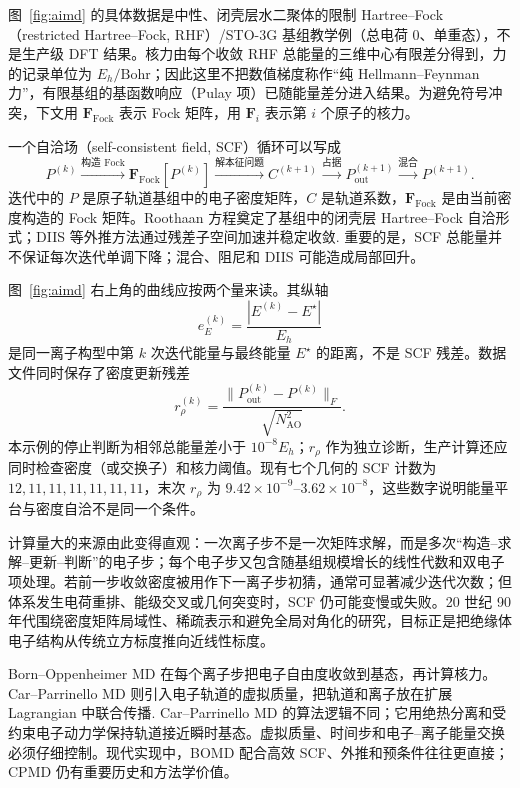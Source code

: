 \documentclass[UTF8,10pt,a4paper,fontset=none]{ctexart}
\begin{document}
图~\ref{fig:aimd} 的具体数据是中性、闭壳层水二聚体的限制 Hartree--Fock（restricted Hartree--Fock, RHF）/STO-3G 基组教学例（总电荷 0、单重态），不是生产级 DFT 结果。核力由每个收敛 RHF 总能量的三维中心有限差分得到，力的记录单位为 $E_h/\mathrm{Bohr}$；因此这里不把数值梯度称作“纯 Hellmann--Feynman 力”，有限基组的基函数响应（Pulay 项）已随能量差分进入结果。为避免符号冲突，下文用 $\mathbf F_{\mathrm{Fock}}$ 表示 Fock 矩阵，用 $\bm F_i$ 表示第 $i$ 个原子的核力。

一个自洽场（self-consistent field, SCF）循环可以写成
\begin{equation}
  P^{(k)} \xrightarrow{\text{构造 Fock}}
  \mathbf F_{\mathrm{Fock}}[P^{(k)}] \xrightarrow{\text{解本征问题}}
  C^{(k+1)} \xrightarrow{\text{占据}}
  P_{\mathrm{out}}^{(k+1)}
  \xrightarrow{\text{混合}} P^{(k+1)}.
\end{equation}
迭代中的 $P$ 是原子轨道基组中的电子密度矩阵，$C$ 是轨道系数，$\mathbf F_{\mathrm{Fock}}$ 是由当前密度构造的 Fock 矩阵。Roothaan 方程奠定了基组中的闭壳层 Hartree--Fock 自洽形式\cite{roothaan1951}；DIIS 等外推方法通过残差子空间加速并稳定收敛\cite{pulay1980}. 重要的是，SCF 总能量并不保证每次迭代单调下降；混合、阻尼和 DIIS 可能造成局部回升。

图~\ref{fig:aimd} 右上角的曲线应按两个量来读。其纵轴
\begin{equation}
  e_E^{(k)}=\frac{|E^{(k)}-E^\star|}{E_h}
\end{equation}
是同一离子构型中第 $k$ 次迭代能量与最终能量 $E^\star$ 的距离，不是 SCF 残差。数据文件同时保存了密度更新残差
\begin{equation}
  r_\rho^{(k)}=\frac{\lVert P_{\mathrm{out}}^{(k)}-P^{(k)}\rVert_F}{\sqrt{N_{\mathrm{AO}}^2}}.
\end{equation}
本示例的停止判断为相邻总能量差小于 $10^{-8}E_h$；$r_\rho$ 作为独立诊断，生产计算还应同时检查密度（或交换子）和核力阈值。现有七个几何的 SCF 计数为 $12,11,11,11,11,11,11$，末次 $r_\rho$ 为 $9.42\times10^{-9}$--$3.62\times10^{-8}$，这些数字说明能量平台与密度自洽不是同一个条件。

计算量大的来源由此变得直观：一次离子步不是一次矩阵求解，而是多次“构造--求解--更新--判断”的电子步；每个电子步又包含随基组规模增长的线性代数和双电子项处理。若前一步收敛密度被用作下一离子步初猜，通常可显著减少迭代次数；但体系发生电荷重排、能级交叉或几何突变时，SCF 仍可能变慢或失败。20 世纪 90 年代围绕密度矩阵局域性、稀疏表示和避免全局对角化的研究，目标正是把绝缘体电子结构从传统立方标度推向近线性标度\cite{goedecker1999}。

Born--Oppenheimer MD 在每个离子步把电子自由度收敛到基态，再计算核力。Car--Parrinello MD 则引入电子轨道的虚拟质量，把轨道和离子放在扩展 Lagrangian 中联合传播\cite{carparrinello1985}. Car--Parrinello MD 的算法逻辑不同；它用绝热分离和受约束电子动力学保持轨道接近瞬时基态。虚拟质量、时间步和电子--离子能量交换必须仔细控制。现代实现中，BOMD 配合高效 SCF、外推和预条件往往更直接；CPMD 仍有重要历史和方法学价值。
\end{document}
